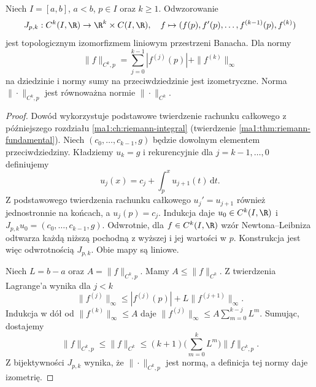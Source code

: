 \begin{twierdzenie}
\label{ma1:thm:ck-initial-data-isomorphism}
Niech $I=[a,b]$, $a<b$, $p\in I$ oraz $k\ge1$.
Odwzorowanie
\[
 J_{p,k}:C^k(I,\R)\to\R^k\times C(I,\R),\quad
 f\mapsto(f(p),f'(p),\ldots,f^{(k-1)}(p),f^{(k)})
\]
jest topologicznym izomorfizmem liniowym
przestrzeni Banacha. Dla normy
\[
 \|f\|_{C^k,p}=\sum_{j=0}^{k-1}|f^{(j)}(p)|
                         +\|f^{(k)}\|_\infty
\]
na dziedzinie i normy sumy na przeciwdziedzinie
jest izometryczne. Norma $\|\cdot\|_{C^k,p}$ jest
równoważna normie $\|\cdot\|_{C^k}$.
\end{twierdzenie}
\begin{proof}
Dowód wykorzystuje podstawowe twierdzenie rachunku
całkowego z późniejszego rozdziału
\ref{ma1:ch:riemann-integral}
(twierdzenie \ref{ma1:thm:riemann-fundamental}).
Niech $(c_0,\ldots,c_{k-1},g)$ będzie dowolnym
elementem przeciwdziedziny. Kładziemy $u_k=g$ i
rekurencyjnie dla $j=k-1,\ldots,0$ definiujemy
\[
 u_j(x)=c_j+\int_p^x u_{j+1}(t)\,\mathrm dt .
\]
Z podstawowego twierdzenia rachunku całkowego
$u_j'=u_{j+1}$ również jednostronnie na końcach,
a $u_j(p)=c_j$. Indukcja daje $u_0\in C^k(I,\R)$
i $J_{p,k}u_0=(c_0,\ldots,c_{k-1},g)$.
Odwrotnie, dla $f\in C^k(I,\R)$ wzór
Newtona--Leibniza odtwarza każdą niższą pochodną
z wyższej i jej wartości w $p$. Konstrukcja jest
więc odwrotnością $J_{p,k}$. Obie mapy są liniowe.

Niech $L=b-a$ oraz $A=\|f\|_{C^k,p}$.
Mamy $A\le\|f\|_{C^k}$. Z twierdzenia Lagrange'a
wynika dla $j<k$
\[
 \|f^{(j)}\|_\infty\le |f^{(j)}(p)|
                         +L\|f^{(j+1)}\|_\infty .
\]
Indukcja w dół od $\|f^{(k)}\|_\infty\le A$
daje $\|f^{(j)}\|_\infty\le
 A\sum_{m=0}^{k-j}L^m$. Sumując, dostajemy
\[
 \|f\|_{C^k,p}\le\|f\|_{C^k}
 \le (k+1)\Big(\sum_{m=0}^kL^m\Big)\|f\|_{C^k,p}.
\]
Z bijektywności $J_{p,k}$ wynika, że
$\|\cdot\|_{C^k,p}$ jest normą, a definicja
tej normy daje izometrię.
\end{proof}

